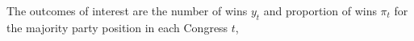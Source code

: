 %
%
%
%
%
%
%
%



\noindent The outcomes of interest are the number of wins $y_t$ and proportion of wins $\pi_t$ for the majority party position in each Congress $t$,

